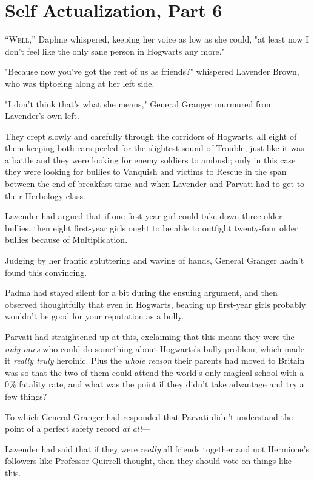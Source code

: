 \chapter{Self Actualization, Part 6}

\lettrine{“W}{ell,''} Daphne
whispered, keeping her voice as low as she could, "at least now I don't feel
like the only sane person in Hogwarts any more."

"Because now you've got the rest of us as friends?" whispered Lavender Brown,
who was tiptoeing along at her left side.

"I don't think that's what she means," General Granger murmured from Lavender's
own left.

They crept slowly and carefully through the corridors of Hogwarts, all eight of
them keeping both ears peeled for the slightest sound of Trouble, just like it
was a battle and they were looking for enemy soldiers to ambush; only in this
case they were looking for bullies to Vanquish and victims to Rescue in the
span between the end of breakfast-time and when Lavender and Parvati had to get
to their Herbology class.

Lavender had argued that if one first-year girl could take down three older
bullies, then eight first-year girls ought to be able to outfight twenty-four
older bullies because of Multiplication.

Judging by her frantic spluttering and waving of hands, General Granger hadn't
found this convincing.

Padma had stayed silent for a bit during the ensuing argument, and then
observed thoughtfully that even in Hogwarts, beating up first-year girls
probably wouldn't be good for your reputation as a bully.

Parvati had straightened up at this, exclaiming that this meant they were the
\emph{only ones} who could do something about Hogwarts's bully problem, which
made it \emph{really truly} heroinic. Plus the \emph{whole reason} their
parents had moved to Britain was so that the two of them could attend the
world's only magical school with a 0\% fatality rate, and what was the point if
they didn't take advantage and try a few things?

To which General Granger had responded that Parvati didn't understand the point
of a perfect safety record \emph{at all}—

Lavender had said that if they were \emph{really} all friends together and not
Hermione's followers like Professor Quirrell thought, then they should vote on
things like this.

